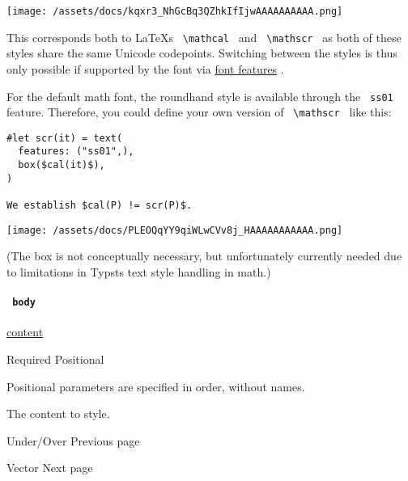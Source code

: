 \texttt{[image: /assets/docs/kqxr3\_NhGcBq3QZhkIfIjwAAAAAAAAAA.png]}

This corresponds both to LaTeX\textquotesingle s
\texttt{\ \textbackslash{}mathcal\ } and
\texttt{\ \textbackslash{}mathscr\ } as both of these styles share the
same Unicode codepoints. Switching between the styles is thus only
possible if supported by the font via
\href{/docs/reference/text/text/\#parameters-features}{font features} .

For the default math font, the roundhand style is available through the
\texttt{\ ss01\ } feature. Therefore, you could define your own version
of \texttt{\ \textbackslash{}mathscr\ } like this:

\begin{verbatim}
#let scr(it) = text(
  features: ("ss01",),
  box($cal(it)$),
)

We establish $cal(P) != scr(P)$.
\end{verbatim}

\texttt{[image: /assets/docs/PLEOQqYY9qiWLwCVv8j\_HAAAAAAAAAAA.png]}

(The box is not conceptually necessary, but unfortunately currently
needed due to limitations in Typst\textquotesingle s text style handling
in math.)

\paragraph{\texorpdfstring{\texttt{\ body\ }}{ body }}\label{functions-cal-body}

\href{/docs/reference/foundations/content/}{content}

{Required} {{ Positional }}

\label{functions-cal-body-positional-tooltip}
Positional parameters are specified in order, without names.

The content to style.

\href{/docs/reference/math/underover/}{\pandocbounded{}}

{ Under/Over } { Previous page }

\href{/docs/reference/math/vec/}{\pandocbounded{}}

{ Vector } { Next page }
